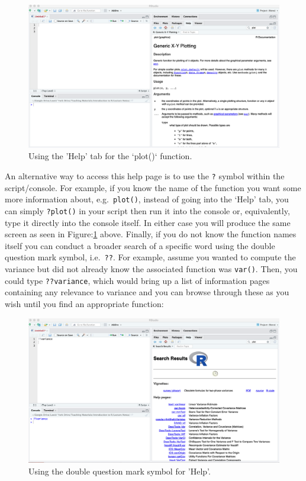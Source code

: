\documentclass[
]{book}
\theoremstyle{definition}
\theoremstyle{definition}
\theoremstyle{definition}
\theoremstyle{definition}
\theoremstyle{remark}
\begin{document}
\begin{figure}

{\centering \includegraphics[width=0.7\linewidth]{Figures/Help} 

}

\caption{Using the 'Help' tab for the `plot()` function.}\label{fig:help}
\end{figure}

An alternative way to access this help page is to use the \texttt{?} symbol within the script/console. For example, if you know the name of the function you want some more information about, e.g.~\texttt{plot()}, instead of going into the `Help' tab, you can simply \texttt{?plot()} in your script then run it into the console or, equivalently, type it directly into the console itself. In either case you will produce the same screen as seen in Figure:\ref{fig:help} above. Finally, if you do not know the function names itself you can conduct a broader search of a specific word using the double question mark symbol, i.e.~\texttt{??}. For example, assume you wanted to compute the variance but did not already know the associated function was \texttt{var()}. Then, you could type \texttt{??variance}, which would bring up a list of information pages containing any relevance to variance and you can browse through these as you wish until you find an appropriate function:

\begin{figure}

{\centering \includegraphics[width=0.7\linewidth]{Figures/Help2} 

}

\caption{Using the double question mark symbol for 'Help'.}\label{fig:help2}
\end{figure}
\end{document}
